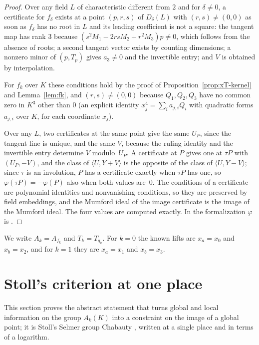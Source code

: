 \documentclass[11pt]{amsart}
\theoremstyle{definition}
\numberwithin{equation}{section}
\begin{document}
\begin{proof}
Over any field $L$ of characteristic different from $2$ and for $\delta\neq0$, a certificate for $f_\delta$ exists at a point $(p,r,s)$ of $D_\delta(L)$ with $(r,s)\neq(0,0)$ as soon as $f_\delta$ has no root in $L$ and its leading coefficient is not a square: the tangent map has rank $3$ because $(s^2M_1-2rsM_2+r^2M_3)p\neq0$, which follows from the absence of roots; a second tangent vector exists by counting dimensions; a nonzero minor of $(p,T_p)$ gives $a_3\neq0$ and the invertible entry; and $V$ is obtained by interpolation.

For $f_k$ over $K$ these conditions hold by the proof of Proposition~\ref{prop:xT-kernel} and Lemma~\ref{lem:fk}, and $(r,s)\neq(0,0)$ because $Q_1,Q_2,Q_3$ have no common zero in $K^3$ other than $0$ (an explicit identity $x_j^4=\sum_ia_{j,i}Q_i$ with quadratic forms $a_{j,i}$ over $K$, for each coordinate $x_j$).

Over any $L$, two certificates at the same point give the same $U_P$,
 since the tangent line is unique, and the same $V$, because the ruling identity and the invertible entry determine $V$ modulo~$U_P$. A certificate at $P$ gives one at $\tau P$ with $(U_P,-V)$, and the class of $\langle U,Y+V\rangle$ is the opposite of the class of $\langle U,Y-V\rangle$; since $\tau$ is an involution, $P$ has a certificate exactly when $\tau P$ has one, so $\varphi(\tau P)=-\varphi(P)$ also when both values are~$0$. The conditions of a certificate are polynomial identities and nonvanishing conditions, so they are preserved by field embeddings, and the Mumford ideal of the image certificate is the image of the Mumford ideal. The four values are computed exactly. In the formalization $\varphi$ is .
\end{proof}

We write $A_k=A_{f_k}$ and $T_k=T_{q_k}$. For $k=0$ the known lifts are $x_a=x_0$ and $x_b=x_2$, and for $k=1$ they are $x_a=x_1$ and $x_b=x_3$.

\section{Stoll's criterion at one place}\label{sec:stoll}

This section proves the abstract statement that turns global and local information on the group $A_k(K)$ into a constraint on the image of a global point; it is Stoll's Selmer group Chabauty \cite[Theorem~2.1]{Stoll17}, written at a single place and in terms of a logarithm.
\end{document}
